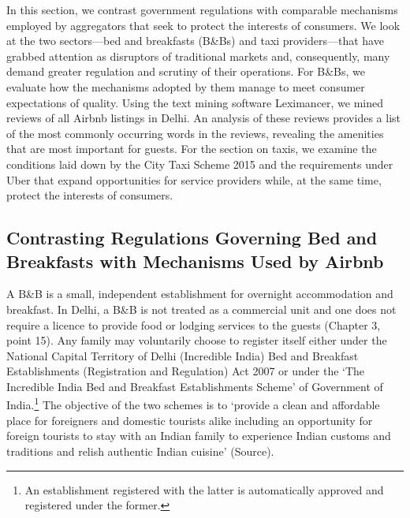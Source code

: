 \documentclass[a4paper, 12pt]{article}
\begin{document}
In this section, we contrast government regulations with comparable mechanisms employed by aggregators that seek to protect the interests of consumers. We look at the two sectors—bed and breakfasts (B\&Bs) and taxi providers—that have grabbed attention as disruptors of traditional markets and, consequently, many demand greater regulation and scrutiny of their operations. For B\&Bs, we evaluate how the mechanisms adopted by them manage to meet consumer expectations of quality. Using the text mining software Leximancer, we mined reviews of all Airbnb listings in Delhi. An analysis of these reviews provides a list of the most commonly occurring words in the reviews, revealing the amenities that are most important for guests. For the section on taxis, we examine the conditions laid down by the City Taxi Scheme 2015 and the requirements under Uber that expand opportunities for service providers while, at the same time, protect the interests of consumers.           
                    
           
                    \subsection{Contrasting Regulations Governing Bed and Breakfasts with Mechanisms Used by Airbnb}

A B\&B is a small, independent establishment for overnight accommodation and breakfast. In Delhi, a B\&B is not treated as a commercial unit and one does not require a licence to provide food or lodging services to the guests (Chapter 3, point 15). Any family may voluntarily choose to register itself either under the National Capital Territory of Delhi (Incredible India) Bed and Breakfast Establishments (Registration and Regulation) Act 2007 or under the ‘The Incredible India Bed and Breakfast Establishments Scheme’ of Government of India.\footnote{An establishment registered with the latter is automatically approved and registered under the former.}  The objective of the two schemes is to ‘provide a clean and affordable place for foreigners and domestic tourists alike including an opportunity for foreign tourists to stay with an Indian family to experience Indian customs and traditions and relish authentic Indian cuisine’ (Source). \\
                    
\end{document}
